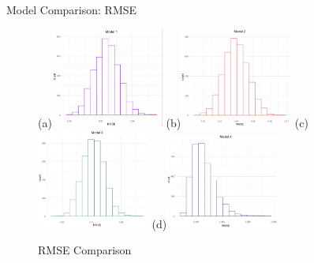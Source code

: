 \documentclass{beamer}
\begin{document}
\begin{frame}{Model Comparison: RMSE}
    \begin{figure}[h!]
        \centering
        
        \subfigure(a){\includegraphics[width=0.33\textwidth]{plots/model1_rmse.png}} 
        \subfigure(b){\includegraphics[width=0.33\textwidth]{plots/model2_rmse.png}} 
        \subfigure(c){\includegraphics[width=0.33\textwidth]{plots/model3_rmse.png}}
        \subfigure(d){\includegraphics[width=0.33\textwidth]{plots/model4_rmse.png}}
       
      
        \caption{RMSE Comparison}
      
    
      \end{figure}   
\end{frame}
\end{document}

